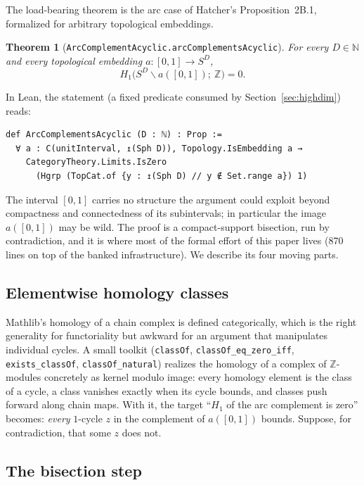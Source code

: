 \documentclass[11pt]{article}
\newtheorem{theorem}{Theorem}[section]
\theoremstyle{definition}
\newcommand{\Z}{\mathbb{Z}}
\newcommand{\N}{\mathbb{N}}
\newcommand{\Sph}[1]{S^{#1}}
\newcommand{\lean}[1]{\texttt{#1}}
\begin{document}
The load-bearing theorem is the arc case of Hatcher's Proposition~2B.1, formalized for arbitrary topological embeddings.

\begin{theorem}[\lean{ArcComplementAcyclic.arcComplementsAcyclic}]
\label{thm:arc}
For every $D \in \N$ and every topological embedding $a \colon [0,1] \to \Sph{D}$,
\[
H_1\bigl(\Sph{D} \smallsetminus a([0,1]);\ \Z\bigr) = 0 .
\]
\end{theorem}

In Lean, the statement (a fixed predicate consumed by Section~\ref{sec:highdim}) reads:

\begin{lstlisting}
def ArcComplementsAcyclic (D : ℕ) : Prop :=
  ∀ a : C(unitInterval, ↥(Sph D)), Topology.IsEmbedding a →
    CategoryTheory.Limits.IsZero
      (Hgrp (TopCat.of {y : ↥(Sph D) // y ∉ Set.range a}) 1)
\end{lstlisting}

The interval $[0,1]$ carries no structure the argument could exploit beyond compactness and connectedness of its subintervals; in particular the image $a([0,1])$ may be wild. The proof is a compact-support bisection, run by contradiction, and it is where most of the formal effort of this paper lives (870 lines on top of the banked infrastructure). We describe its four moving parts.

\subsection{Elementwise homology classes}

Mathlib's homology of a chain complex is defined categorically, which is the right generality for functoriality but awkward for an argument that manipulates individual cycles. A small toolkit (\lean{classOf}, \lean{classOf\_eq\_zero\_iff}, \lean{exists\_classOf}, \lean{classOf\_natural}) realizes the homology of a complex of $\Z$-modules concretely as kernel modulo image: every homology element is the class of a cycle, a class vanishes exactly when its cycle bounds, and classes push forward along chain maps. With it, the target ``$H_1$ of the arc complement is zero'' becomes: \emph{every} $1$-cycle $z$ in the complement of $a([0,1])$ bounds. Suppose, for contradiction, that some $z$ does not.

\subsection{The bisection step}
\end{document}
